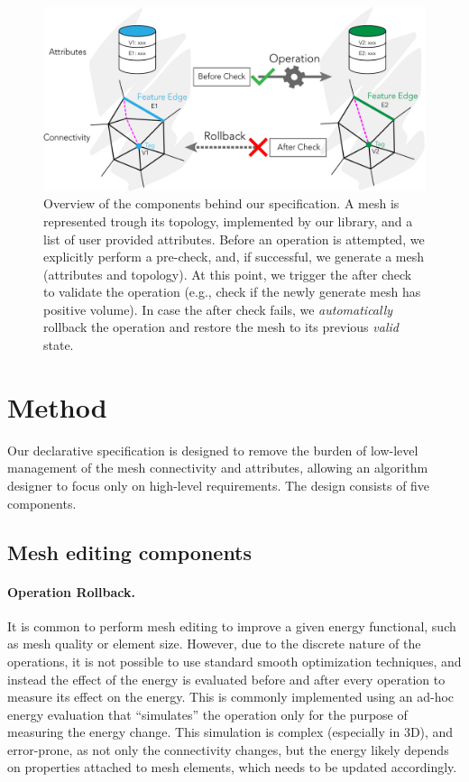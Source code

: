 \begin{figure}
    \centering\footnotesize
    \includegraphics[width=\linewidth]{wmtk-tex/figs/pipeline_illustration.pdf}
    \caption{{Overview of the components behind our specification. A mesh is represented trough its topology, implemented by our library, and a list of user provided attributes. Before an operation is attempted, we explicitly perform a pre-check, and, if successful, we generate a mesh (attributes and topology). At this point, we trigger the after check to validate the operation (e.g., check if the newly generate mesh has positive volume). In case the after check fails, we \emph{automatically} rollback the operation and restore the mesh to its previous \emph{valid} state.}}
    \label{fig:pipeline}
\end{figure}

\section{Method}

Our declarative specification is designed to remove the burden of low-level management of the mesh connectivity {and attributes}, allowing an algorithm designer to focus only on high-level requirements. The design consists of five components. 

\subsection{{Mesh editing components}}

\paragraph{Operation Rollback.}
It is common to perform mesh editing to improve a given energy functional, such as mesh quality or element size. However, due to the discrete nature of the operations, it is not possible to use standard smooth optimization techniques, and instead the effect of the energy is evaluated before and after every operation to measure its effect on the energy. This is commonly implemented using an ad-hoc energy evaluation that ``simulates'' the operation only for the purpose of measuring the energy change. This simulation is complex (especially in 3D), and error-prone, as not only the connectivity changes, but the energy likely depends on properties attached to mesh elements, which needs to be updated accordingly.

